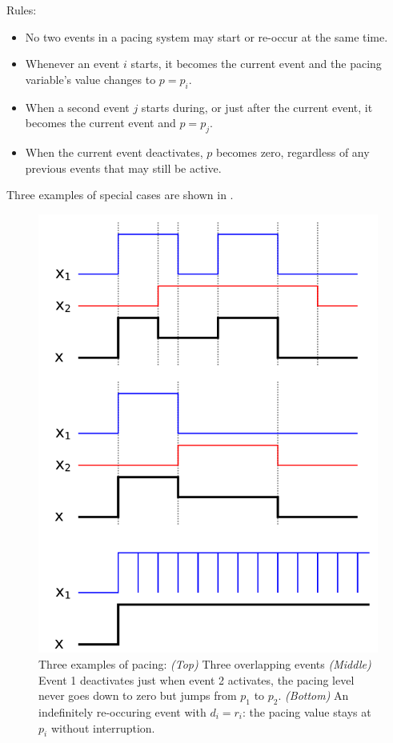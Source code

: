 Rules:

\begin{itemize}
\item No two events in a pacing system may start or re-occur at the same time.
\item Whenever an event $i$ starts, it becomes the current event and the pacing
 variable's value changes to $p=p_i$.
\item When a second event $j$ starts during, or just after the current event,
 it becomes the current event and $p=p_j$.
\item When the current event deactivates, $p$ becomes zero, regardless of any
 previous events that may still be active.
\end{itemize}

Three examples of special cases are shown in .

\begin{figure}
\noindent
\begin{centering}
\includegraphics{figures/pacing-examples}
\par
\end{centering}
\caption{
\label{fig:pacing-examples}
Three examples of pacing:
\textit{(Top)} Three overlapping events
\textit{(Middle)} Event 1 deactivates just when event 2 activates, the pacing
 level never goes down to zero but jumps from $p_1$ to $p_2$.
\textit{(Bottom)} An indefinitely re-occuring event with $d_i = r_i$: the pacing
 value stays at $p_i$ without interruption.
}
\end{figure}


